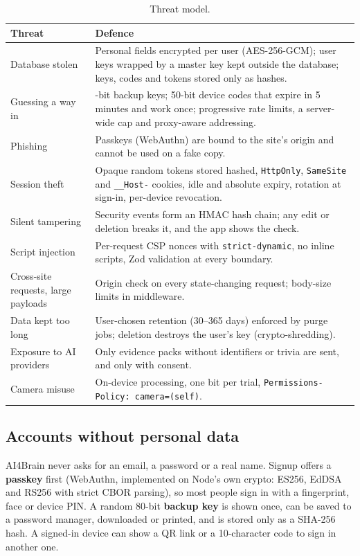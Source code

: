 \documentclass[11pt,a4paper]{article}
\newcommand{\code}[1]{\texttt{\small #1}}
\begin{document}
\begin{table}[H]
\centering\small
\caption{Threat model.}
\label{tab:threats}
\begin{tabularx}{\linewidth}{@{}>{\raggedright}p{3.6cm} >{\raggedright\arraybackslash}X@{}}
\toprule
Threat & Defence\\
\midrule
Database stolen & Personal fields encrypted per user (AES-256-GCM); user keys wrapped by a master key kept outside the database; keys, codes and tokens stored only as hashes.\\
Guessing a way in & 80-bit backup keys; 50-bit device codes that expire in 5 minutes and work once; progressive rate limits, a server-wide cap and proxy-aware addressing.\\
Phishing & Passkeys (WebAuthn) are bound to the site's origin and cannot be used on a fake copy.\\
Session theft & Opaque random tokens stored hashed, \code{HttpOnly}, \code{SameSite} and \code{\_\_Host-} cookies, idle and absolute expiry, rotation at sign-in, per-device revocation.\\
Silent tampering & Security events form an HMAC hash chain; any edit or deletion breaks it, and the app shows the check.\\
Script injection & Per-request CSP nonces with \code{strict-dynamic}, no inline scripts, Zod validation at every boundary.\\
Cross-site requests, large payloads & Origin check on every state-changing request; body-size limits in middleware.\\
Data kept too long & User-chosen retention (30--365 days) enforced by purge jobs; deletion destroys the user's key (crypto-shredding).\\
Exposure to AI providers & Only evidence packs without identifiers or trivia are sent, and only with consent.\\
Camera misuse & On-device processing, one bit per trial, \code{Permissions-Policy: camera=(self)}.\\
\bottomrule
\end{tabularx}
\end{table}

\subsection{Accounts without personal data}
AI4Brain never asks for an email, a password or a real name. Signup offers a \textbf{passkey} first (WebAuthn, implemented on Node's own crypto: ES256, EdDSA and RS256 with strict CBOR parsing), so most people sign in with a fingerprint, face or device PIN. A random 80-bit \textbf{backup key} is shown once, can be saved to a password manager, downloaded or printed, and is stored only as a SHA-256 hash. A signed-in device can show a QR link or a 10-character code to sign in another one.
\end{document}
